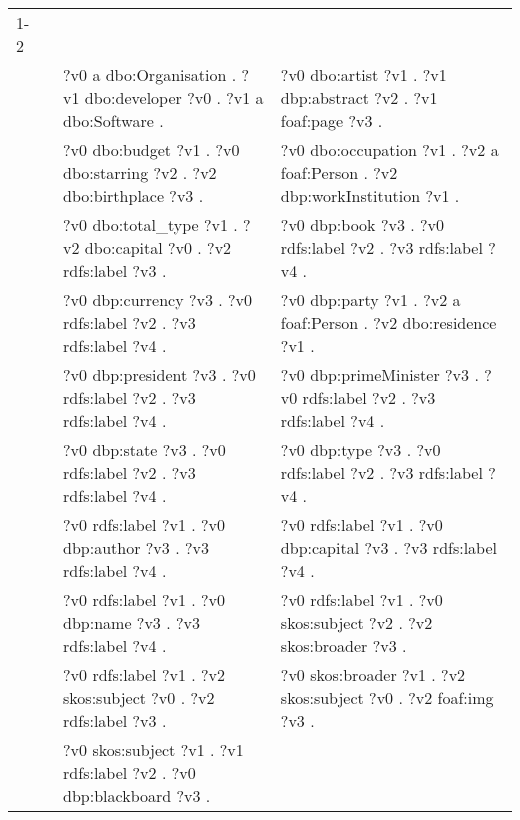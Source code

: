 \begin{table}
{\begin{tabular}{!{\color{white}\vrule}l!{\color{white}\vrule}c@{\hs}!{\color{white}\vrule}p{11.5cm}!{\color{white}\vrule}p{11.5cm}!{\color{white}\vrule}}
			\midrule
			1-2 & \phantom{a} & \\
			 &  \phantom{a} &   ?v0 a dbo:Organisation .  ?v1 dbo:developer ?v0 .  ?v1 a dbo:Software . &  ?v0 dbo:artist ?v1 .  ?v1 dbp:abstract ?v2 .  ?v1 foaf:page ?v3 . \\
			 &  \phantom{a} &  ?v0 dbo:budget ?v1 .  ?v0 dbo:starring ?v2 .  ?v2 dbo:birthplace ?v3 . &  ?v0 dbo:occupation ?v1 .  ?v2 a foaf:Person .  ?v2 dbp:workInstitution ?v1 . \\
			 &  \phantom{a} &   ?v0 dbo:total\_type ?v1 .  ?v2 dbo:capital ?v0 .  ?v2 rdfs:label ?v3 . &  ?v0 dbp:book ?v3 .  ?v0 rdfs:label ?v2 .  ?v3 rdfs:label ?v4 . \\
			 &  \phantom{a} &  ?v0 dbp:currency ?v3 .  ?v0 rdfs:label ?v2 .  ?v3 rdfs:label ?v4 . &  ?v0 dbp:party ?v1 .  ?v2 a foaf:Person .  ?v2 dbo:residence ?v1 . \\
			 &  \phantom{a} &   ?v0 dbp:president ?v3 .  ?v0 rdfs:label ?v2 .  ?v3 rdfs:label ?v4 . &  ?v0 dbp:primeMinister ?v3 .  ?v0 rdfs:label ?v2 .  ?v3 rdfs:label ?v4 . \\
			 &  \phantom{a} &  ?v0 dbp:state ?v3 .  ?v0 rdfs:label ?v2 .  ?v3 rdfs:label ?v4 . &  ?v0 dbp:type ?v3 .  ?v0 rdfs:label ?v2 .  ?v3 rdfs:label ?v4 . \\
			 &  \phantom{a} &   ?v0 rdfs:label ?v1 .  ?v0 dbp:author ?v3 .  ?v3 rdfs:label ?v4 . &  ?v0 rdfs:label ?v1 .  ?v0 dbp:capital ?v3 .  ?v3 rdfs:label ?v4 . \\
			 &  \phantom{a} &  ?v0 rdfs:label ?v1 .  ?v0 dbp:name ?v3 .  ?v3 rdfs:label ?v4 . &  ?v0 rdfs:label ?v1 .  ?v0 skos:subject ?v2 .  ?v2 skos:broader ?v3 . \\
			 &  \phantom{a} &   ?v0 rdfs:label ?v1 .  ?v2 skos:subject ?v0 .  ?v2 rdfs:label ?v3 . &  ?v0 skos:broader ?v1 .  ?v2 skos:subject ?v0 .  ?v2 foaf:img ?v3 . \\
			 &  \phantom{a} &  ?v0 skos:subject ?v1 .  ?v1 rdfs:label ?v2 .  ?v0 dbp:blackboard ?v3 . & \\


\end{tabular}}
\end{table}
